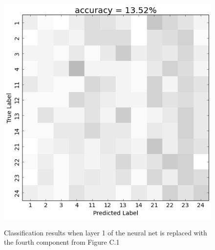\begin{figure}[h] 
  \begin{center}
    \includegraphics[scale=0.5]{Figures/PC3_confusion}
   \\\vspace{-0.8em}
    \caption{Classification results when layer 1 of the neural net is replaced with the fourth component from Figure C.1}
    \label{fig:PC3_confusion}
  \end{center}
  \vspace{-1em}
\end{figure}